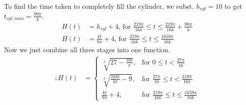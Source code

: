 \documentclass[12pt, a4 paper]{article}
\begin{document}
\begin{outline}[enumerate]
\begin{answer}
\begin{align*}
  \end{align*}
  To find the time taken to completely fill the cylinder, we subst. \(h_{cyl}=10\) to get \(t_{cyl,max}=\frac{90\pi}{k}\).
  \begin{align*}
   H(t) & = h_{cyl} + 4 \textrm{, for }\frac{219\pi}{16k} \leq t \leq \frac{219\pi}{16k} + \frac{90\pi}{k} \\
   H(t) & = \frac{kt}{9\pi}+4 \textrm{, for }\frac{219\pi}{16k} \leq t \leq \frac{1659\pi}{16k}
  \end{align*}
  Now we just combine all three stages into one function.
  \begin{align*}
   \therefore H(t) & =
   \begin{cases}
    \sqrt[3]{27-\frac{16t}{\pi}},  & \textrm{for }  0 \leq t < \frac{27\pi}{16}                       \\
    \sqrt[3]{\frac{16kt}{3\pi}-9}, & \textrm{for } \frac{27\pi}{16} \leq t < \frac{219\pi}{16k}       \\
    \frac{kt}{9\pi}+4,             & \textrm{for } \frac{219\pi}{16k} \leq t \leq \frac{1659\pi}{16k}
   \end{cases}
  \end{align*}
 \end{answer}


\end{outline}
\end{document}
